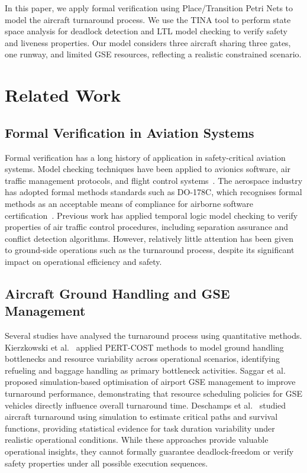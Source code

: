 \documentclass[conference]{IEEEtran}
\begin{document}
In this paper, we apply formal verification using Place/Transition Petri Nets to
model the aircraft turnaround process. We use the TINA tool to perform state
space analysis for deadlock detection and LTL model checking to verify safety
and liveness properties. Our model considers three aircraft sharing three gates,
one runway, and limited GSE resources, reflecting a realistic constrained
scenario.


\section{Related Work}

\subsection{Formal Verification in Aviation Systems}

Formal verification has a long history of application in safety-critical
aviation systems. Model checking techniques have been applied to avionics
software, air traffic management protocols, and flight control systems~\cite{b6}.
The aerospace industry has adopted formal methods standards such as DO-178C,
which recognises formal methods as an acceptable means of compliance for
airborne software certification~\cite{b7}. Previous work has applied temporal
logic model checking to verify properties of air traffic control procedures,
including separation assurance and conflict detection algorithms. However,
relatively little attention has been given to ground-side operations such as the
turnaround process, despite its significant impact on operational efficiency and
safety.

\subsection{Aircraft Ground Handling and GSE Management}

Several studies have analysed the turnaround process using quantitative methods.
Kierzkowski et al.~\cite{b11} applied PERT-COST methods to model ground handling
bottlenecks and resource variability across operational scenarios, identifying
refueling and baggage handling as primary bottleneck activities. Saggar
et al.~\cite{b8} proposed simulation-based optimisation of airport GSE management
to improve turnaround performance, demonstrating that resource scheduling
policies for GSE vehicles directly influence overall turnaround time. Deschamps
et al.~\cite{b15} studied aircraft turnaround using simulation to estimate
critical paths and survival functions, providing statistical evidence for task
duration variability under realistic operational conditions. While these
approaches provide valuable operational insights, they cannot formally guarantee
deadlock-freedom or verify safety properties under all possible execution
sequences.
\end{document}
